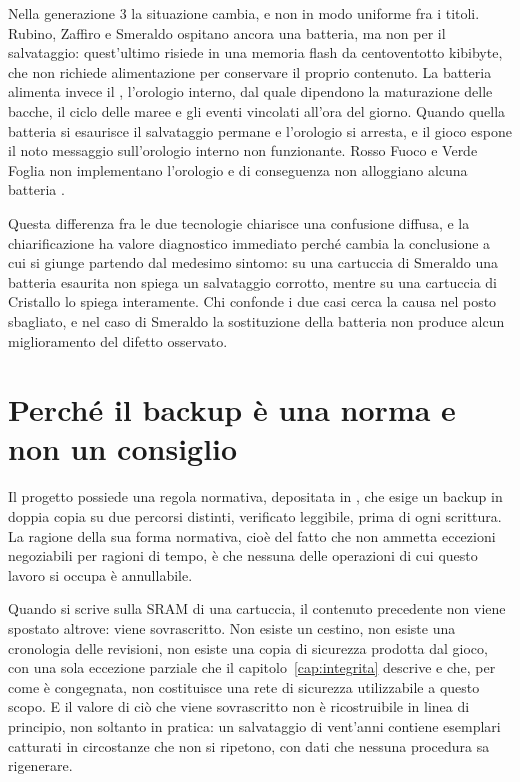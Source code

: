 Nella generazione 3 la situazione cambia, e non in modo uniforme fra i titoli. Rubino, Zaffiro e Smeraldo ospitano ancora una batteria, ma non per il salvataggio: quest'ultimo risiede in una memoria flash da centoventotto kibibyte, che non richiede alimentazione per conservare il proprio contenuto. La batteria alimenta invece il , l'orologio interno, dal quale dipendono la maturazione delle bacche, il ciclo delle maree e gli eventi vincolati all'ora del giorno. Quando quella batteria si esaurisce il salvataggio permane e l'orologio si arresta, e il gioco espone il noto messaggio sull'orologio interno non funzionante. Rosso Fuoco e Verde Foglia non implementano l'orologio e di conseguenza non alloggiano alcuna batteria \cite{pokefirered}.

Questa differenza fra le due tecnologie chiarisce una confusione diffusa, e la chiarificazione ha valore diagnostico immediato perché cambia la conclusione a cui si giunge partendo dal medesimo sintomo: su una cartuccia di Smeraldo una batteria esaurita non spiega un salvataggio corrotto, mentre su una cartuccia di Cristallo lo spiega interamente. Chi confonde i due casi cerca la causa nel posto sbagliato, e nel caso di Smeraldo la sostituzione della batteria non produce alcun miglioramento del difetto osservato.

\section{Perché il backup è una norma e non un consiglio}

Il progetto possiede una regola normativa, depositata in , che esige un backup in doppia copia su due percorsi distinti, verificato leggibile, prima di ogni scrittura. La ragione della sua forma normativa, cioè del fatto che non ammetta eccezioni negoziabili per ragioni di tempo, è che nessuna delle operazioni di cui questo lavoro si occupa è annullabile.

Quando si scrive sulla SRAM di una cartuccia, il contenuto precedente non viene spostato altrove: viene sovrascritto. Non esiste un cestino, non esiste una cronologia delle revisioni, non esiste una copia di sicurezza prodotta dal gioco, con una sola eccezione parziale che il capitolo~\ref{cap:integrita} descrive e che, per come è congegnata, non costituisce una rete di sicurezza utilizzabile a questo scopo. E il valore di ciò che viene sovrascritto non è ricostruibile in linea di principio, non soltanto in pratica: un salvataggio di vent'anni contiene esemplari catturati in circostanze che non si ripetono, con dati che nessuna procedura sa rigenerare.


